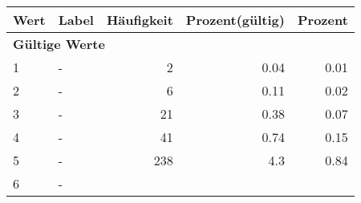      \begin{longtable}{lXrrr}
     \toprule
     \textbf{Wert} & \textbf{Label} & \textbf{Häufigkeit} & \textbf{Prozent(gültig)} & \textbf{Prozent} \\
     \endhead
     \midrule
     \multicolumn{5}{l}{\textbf{Gültige Werte}}\\

     1 &
     \multicolumn{1}{X}{ -  } &


       \num{2} &
       \num[round-mode=places,round-precision=2]{0.04} &
         \num[round-mode=places,round-precision=2]{0.01} \\

     2 &
     \multicolumn{1}{X}{ -  } &


       \num{6} &
       \num[round-mode=places,round-precision=2]{0.11} &
         \num[round-mode=places,round-precision=2]{0.02} \\

     3 &
     \multicolumn{1}{X}{ -  } &


       \num{21} &
       \num[round-mode=places,round-precision=2]{0.38} &
         \num[round-mode=places,round-precision=2]{0.07} \\

     4 &
     \multicolumn{1}{X}{ -  } &


       \num{41} &
       \num[round-mode=places,round-precision=2]{0.74} &
         \num[round-mode=places,round-precision=2]{0.15} \\

     5 &
     \multicolumn{1}{X}{ -  } &


       \num{238} &
       \num[round-mode=places,round-precision=2]{4.3} &
         \num[round-mode=places,round-precision=2]{0.84} \\

     6 &
     \multicolumn{1}{X}{ -  } &



\end{longtable}
